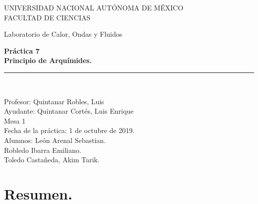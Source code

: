\documentclass[a4paper]{article}
\begin{document}
\begin{titlepage}
\begin{center}
\begin{figure}
\end{figure}
\vspace*{0.5in}
UNIVERSIDAD NACIONAL AUTÓNOMA DE MÉXICO\\
\vspace*{0.2in}
FACULTAD DE CIENCIAS \\
\vspace*{0.5in}
\begin{large}
Laboratorio de Calor, Ondas y Fluidos\\
\end{large}
\vspace*{0.2in}
\begin{Large}
\textbf{Práctica 7} \\
\textbf{Principio de Arquímides.} \\
\end{Large}
\vspace*{0.3in}
\vspace*{0.3in}
\rule{80mm}{0.1mm}\\
\vspace*{0.1in}
\begin{large}
Profesor:  Quintanar Robles, Luis  \\
Ayudante: Quintanar Cortés, Luis Enrique \\
Mesa 1\\
Fecha de la práctica: 1 de octubre de 2019.\\
Alumnos: León Arenal Sebastian.\\
Robledo Ibarra Emiliano. \\
Toledo Castañeda, Akim Tarik.\\

\end{large}
\end{center}
\end{titlepage}



\section*{Resumen.}
\end{document}

